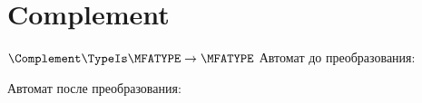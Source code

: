 \section{Complement}
\begin{frame}{$\Complement\TypeIs\MFATYPE\to\MFATYPE$}
	Автомат до преобразования:

	Автомат после преобразования:

\end{frame}